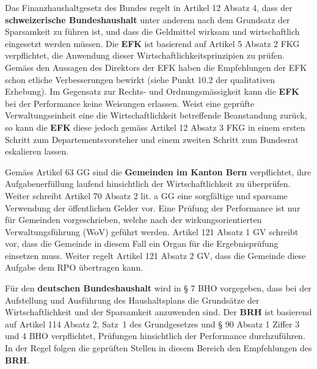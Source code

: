 \documentclass[10pt]{article}
\begin{document}
Das Finanzhaushaltgesetz des Bundes regelt in Artikel 12 Absatz 4, dass der \textbf{schweizerische Bundeshaushalt} unter anderem nach dem Grundsatz der Sparsamkeit zu führen ist, und dass die Geldmittel wirksam und wirtschaftlich eingesetzt werden müssen. Die \textbf{EFK} ist basierend auf Artikel 5 Absatz 2 FKG verpflichtet, die Anwendung dieser Wirtschaftlichkeitsprinzipien zu prüfen. Gemäss den Aussagen des Direktors der EFK haben die Empfehlungen der EFK schon etliche Verbesserungen bewirkt (siehe Punkt 10.2 der qualitativen Erhebung). Im Gegensatz zur Rechts- und Ordnungs­mässig­keit kann die \textbf{EFK} bei der Performance keine Weisungen erlassen. Weist eine geprüfte Verwaltungseinheit eine die Wirtschaftlichkeit betreffende Beanstandung zurück, so kann die \textbf{EFK} diese jedoch gemäss Artikel 12 Absatz 3 FKG in einem ersten Schritt zum Departementsvorsteher und einem zweiten Schritt zum Bundesrat eskalieren lassen.

Gemäss Artikel 63 GG sind die \textbf{Gemeinden im Kanton Bern} verpflichtet, ihre Aufgabenerfüllung laufend hinsichtlich der Wirtschaftlichkeit zu überprüfen. Weiter schreibt Artikel 70 Absatz 2 lit. a GG eine sorgfältige und sparsame Verwendung der öffentlichen Gelder vor. Eine Prüfung der Performance ist nur für Gemeinden vorgeschrieben, welche nach der wirkungsorientierten Verwaltungsführung (WoV) geführt werden. Artikel 121 Absatz 1 GV schreibt vor, dass die Gemeinde in diesem Fall ein Organ für die Ergebnisprüfung einsetzen muss. Weiter regelt Artikel 121 Absatz 2 GV, dass die Gemeinde diese Aufgabe dem RPO übertragen kann.

Für den \textbf{deutschen Bundeshaushalt} wird in § 7 BHO vorgegeben, dass bei der Aufstellung und Ausführung des Haushaltsplans die Grundsätze der Wirtschaftlichkeit und der Sparsamkeit anzuwenden sind. Der \textbf{BRH} ist basierend auf Artikel 114 Absatz 2, Satz~1 des Grundgesetzes und § 90 Absatz 1 Ziffer 3 und 4 BHO verpflichtet, Prüfungen hinsichtlich der Performance durchzuführen. In der Regel folgen die geprüften Stellen in diesem Bereich den Empfehlungen des \textbf{BRH}.

\newpage
\end{document}
